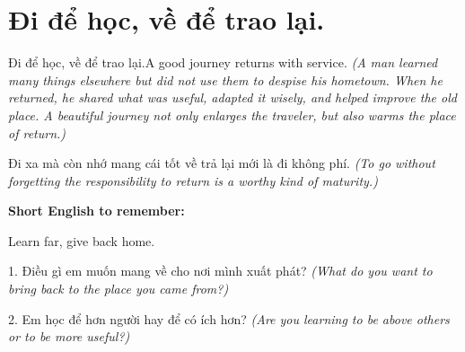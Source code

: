 \section{Đi để học, về để trao lại.}
\begin{truyen}{Đi để học, về để trao lại.}{A good journey returns with service.}
\textit{(A man learned many things elsewhere but did not use them to despise his hometown. When he returned, he shared what was useful, adapted it wisely, and helped improve the old place. A beautiful journey not only enlarges the traveler, but also warms the place of return.)}
\end{truyen}
\begin{baihoc}
Đi xa mà còn nhớ mang cái tốt về trả lại mới là đi không phí.
\textit{(To go without forgetting the responsibility to return is a worthy kind of maturity.)}
\end{baihoc}
\begin{ghinhoanh}
\textbf{Short English to remember:}

Learn far, give back home.
\end{ghinhoanh}
\begin{tuhocnhanh}
1. Điều gì em muốn mang về cho nơi mình xuất phát? \textit{(What do you want to bring back to the place you came from?)}

2. Em học để hơn người hay để có ích hơn? \textit{(Are you learning to be above others or to be more useful?)}
\end{tuhocnhanh}
\ngancach

